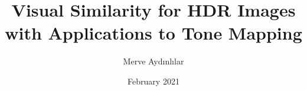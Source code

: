 \documentclass[chaparabic,ceng,phd,12pt,oneandhalf,fivejury]{metu}
\author{Merve Aydınlılar}
\title{Visual Similarity for HDR Images with Applications to Tone Mapping}
\date{February 2021}
\begin{document}
\begin{preliminaries}


\end{preliminaries}
%   
% 
%

\setlength{\parindent}{0em}
\setlength{\parskip}{10pt}












%
%

%

\appendix





\end{document}
